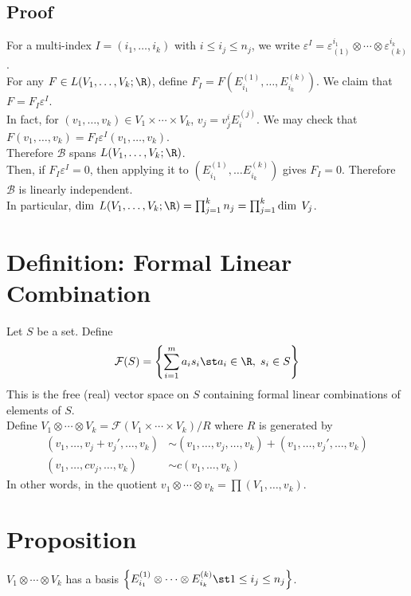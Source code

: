 \documentclass[11pt]{article}
\begin{document}
\subsection*{Proof}
\label{sec:org6e33d43}
For a multi-index \(I=(i_{1},\ldots,i_{k})\) with \(i\leq i_{j}\leq n_{j}\), we write \(\varepsilon^{I}=\varepsilon_{(1)}^{i_{1}}\otimes\cdots\otimes\varepsilon_{(k)}^{i_{k}}\).\\
For any \(F\in L(V_{1},\ldots,V_{k};\R)\), define \(F_{I}=F(E_{i_{1}}^{(1)},\ldots,E_{i_{k}}^{(k)})\). We claim that \(F=F_{I}\varepsilon^{I}\).\\
In fact, for \((v_{1},\ldots,v_{k})\in V_{1}\times\cdots\times V_{k}\), \(v_{j}=v_{j}^{i}E_{i}^{(j)}\). We may check that \(F(v_{1},\ldots,v_{k})=F_{I}\varepsilon^{I}(v_{1},\ldots,v_{k})\).\\
Therefore \(\mathcal{B}\) spans \(L(V_{1},\ldots,V_{k};\R)\).\\
Then, if \(F_{I}\varepsilon^{I}=0\), then applying it to \((E_{i_{1}}^{(1)},\ldots E_{i_{k}}^{(k)})\) gives \(F_{I}=0\). Therefore \(\mathcal{B}\) is linearly independent.\\
In particular, \(\dim\;L(V_{1},\ldots,V_{k};\R)=\prod_{j=1}^{k}n_{j}=\prod_{j=1}^{k}\dim\;V_{j}\).\\
\section*{Definition: Formal Linear Combination}
\label{sec:org68967ed}
Let \(S\) be a set. Define\\
\begin{align*}
  \mathcal{F}(S)
  =\left\{ \sum_{i=1}^{m}a_{i}s_{i}\st a_{i}\in\R,\;s_{i}\in S \right\}
\end{align*}
This is the free (real) vector space on \(S\) containing formal linear combinations of elements of \(S\).\\
Define \(V_{1}\otimes\cdots\otimes V_{k}=\mathcal{F}(V_{1}\times\cdots\times V_{k})/R\) where \(R\) is generated by\\
\begin{align*}
  (v_{1},\ldots,v_{j}+v_{j}',\ldots,v_{k})
  &\sim(v_{1},\ldots,v_{j},\ldots,v_{k})+(v_{1},\ldots,v_{j}',\ldots,v_{k}) \\
  (v_{1},\ldots,cv_{j},\ldots,v_{k})
  &\sim c(v_{1},\ldots,v_{k})
\end{align*}
In other words, in the quotient \(v_{1}\otimes\cdots\otimes v_{k}=\prod(V_{1},\ldots,v_{k})\).\\
\section*{Proposition}
\label{sec:org559daa7}
\(V_{1}\otimes\cdots\otimes V_{k}\) has a basis \(\left\{ E_{i_{1}}^{(1)}\otimes\cdots\otimes E_{i_{k}}^{(k)}\st 1\leq i_{j}\leq n_{j} \right\}\).\\
\end{document}
